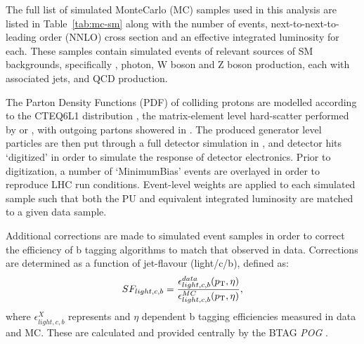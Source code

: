 The full list of simulated MonteCarlo (MC) samples used in this analysis are listed in 
Table~\ref{tab:mc-sm} along with the number of events, next-to-next-to-leading 
order (NNLO) cross section and an effective integrated luminosity for each. These
samples contain simulated events of relevant sources of SM backgrounds, specifically
\ttbar, photon, W boson and Z boson production, each with associated jets, and QCD
production. 

The Parton Density Functions (PDF) of colliding protons are modelled according
to the
CTEQ6L1 distribution \cite{Pumplin:2002vw}, the matrix-element level hard-scatter
performed by
\MADGRAPHFIVE \cite{Alwall:2007st} or \PYTHIASIX \cite{Sjostrand:2000wi}, with
outgoing partons showered in \PYTHIASIX. The
produced generator level particles are then put through a full detector
simulation in \GEANTFOUR \cite{Agostinelli2003250}, and detector hits `digitized'
in order to simulate the response of detector electronics. Prior to digitization, a number of
`MinimumBias' events are overlayed in order to reproduce LHC run conditions. Event-level weights
are applied to each simulated sample such that both the PU and equivalent
integrated luminosity are matched to a given data sample.

Additional corrections are made to simulated event samples in order to correct
the efficiency of b tagging algorithms to match that observed in data.
Corrections are determined as a function of jet-flavour (light/c/b), defined as:
% 
\begin{equation}
SF_{light,c,b} = \frac{\epsilon^{data}_{light,c,b}({p_{\text T}}, \eta)}{\epsilon^
{MC}_ {light,c,b}({p_{\text T}}, \eta)} ,
\label{eq:btag_scalefactor}
\end{equation}
% 
where $\epsilon^{X}_{light, c, b}$ represents \Pt and $\eta$ dependent
b tagging efficiencies measured in data and MC. These are calculated and provided
centrally by the BTAG \emph{POG} \cite{btagpog-scalefactors}.

